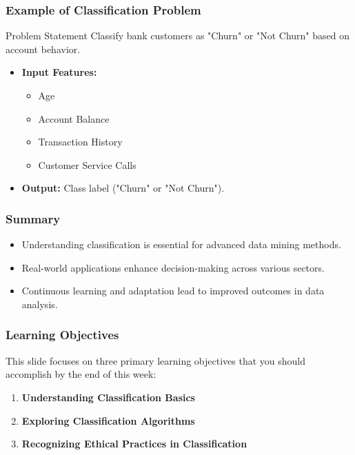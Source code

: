 \documentclass[aspectratio=169]{beamer}
\begin{document}
\begin{frame}[fragile]
    \frametitle{Example of Classification Problem}
    \begin{block}{Problem Statement}
        Classify bank customers as "Churn" or "Not Churn" based on account behavior.
    \end{block}
    \begin{itemize}
        \item \textbf{Input Features:}
            \begin{itemize}
                \item Age
                \item Account Balance
                \item Transaction History
                \item Customer Service Calls
            \end{itemize}
        \item \textbf{Output:} Class label ("Churn" or "Not Churn").
    \end{itemize}
\end{frame}

\begin{frame}[fragile]
    \frametitle{Summary}
    \begin{itemize}
        \item Understanding classification is essential for advanced data mining methods.
        \item Real-world applications enhance decision-making across various sectors.
        \item Continuous learning and adaptation lead to improved outcomes in data analysis.
    \end{itemize}
\end{frame}

\begin{frame}[fragile]
    \frametitle{Learning Objectives}
    This slide focuses on three primary learning objectives that you should accomplish by the end of this week:
    \begin{enumerate}
        \item \textbf{Understanding Classification Basics}
        \item \textbf{Exploring Classification Algorithms}
        \item \textbf{Recognizing Ethical Practices in Classification}
    \end{enumerate}
\end{frame}
\end{document}

